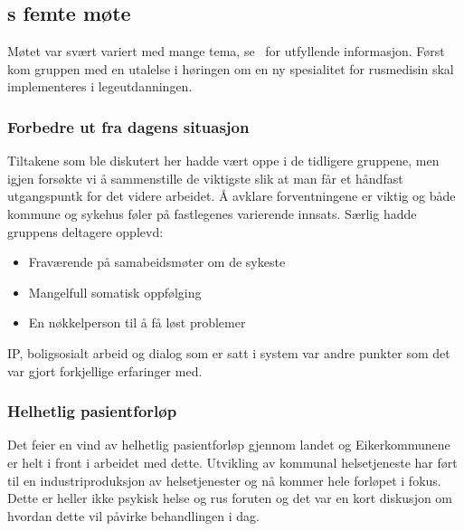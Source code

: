 \documentclass[11pt]{report} %
\begin{document}
                  \subsection{s femte møte}\label{sec:agr_5}
                    Møtet var svært variert med mange tema, se~\cite{arbgr_mref-5} for utfyllende informasjon. Først kom gruppen med en utalelse i høringen om en ny spesialitet for rusmedisin skal implementeres i legeutdanningen.\\
                    \subsubsection{Forbedre ut fra dagens situasjon}
                      Tiltakene som ble diskutert her hadde vært oppe i de tidligere gruppene, men igjen forsøkte vi å sammenstille de viktigste slik at man får et håndfast utgangspuntk for det videre arbeidet. Å avklare forventningene er viktig og både kommune og sykehus føler på fastlegenes varierende innsats. Særlig hadde gruppens deltagere opplevd:\\
                        \begin{itemize}
                          \item Fraværende på samabeidsmøter om de sykeste\\
                          \item Mangelfull somatisk oppfølging\\
                          \item En nøkkelperson til å få løst problemer\\
                        \end{itemize}
                      IP, boligsosialt arbeid og dialog som er satt i system var andre punkter som det var gjort forkjellige erfaringer med. 
                    \subsubsection{Helhetlig pasientforløp}
                     Det feier en vind av helhetlig pasientforløp gjennom landet og Eikerkommunene er helt i front i arbeidet med dette. Utvikling av kommunal helsetjeneste har ført til en industriproduksjon av helsetjenester og nå kommer hele forløpet i fokus. Dette er heller ikke psykisk helse og rus foruten og det var en kort diskusjon om hvordan dette vil påvirke behandlingen i dag. 
\end{document}
